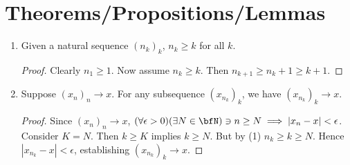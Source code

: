 \section*{Theorems/Propositions/Lemmas}
    \begin{enumerate}[label = (\arabic*)]
        \item Given a natural sequence $(n_k)_k$, $n_k \geq k$ for all $k$.
            {\color{red}\begin{proof}
                Clearly $n_1 \geq 1$. Now assume $n_k \geq k$. Then $n_{k+1} \geq n_k + 1 \geq k + 1$.
            \end{proof}}

        \item Suppose $(x_n)_n \rightarrow x$. For any subsequence $(x_{n_k})_k$, we have $(x_{n_k})_k \rightarrow x$.
            {\color{red} \begin{proof}
                Since $(x_n)_n \rightarrow x$, $(\forall \epsilon > 0)(\exists N \in \bfN) \ni n \geq N \implies |x_n - x| < \epsilon$. Consider $K = N$. Then $k \geq K$ implies $k \geq N$. But by (1) $n_k \geq k \geq N$. Hence $|x_{n_k} - x| < \epsilon$, establishing $(x_{n_k})_k \rightarrow x$.
            \end{proof}}


\end{enumerate}

